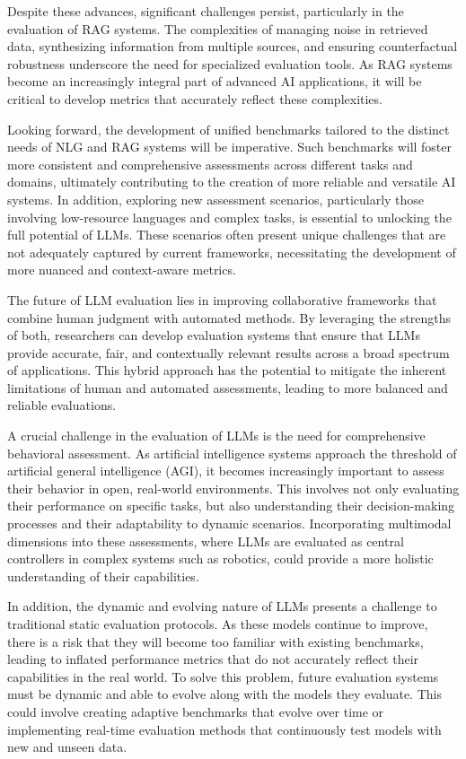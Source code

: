 Despite these advances, significant challenges persist, particularly in the evaluation of RAG systems. The complexities of managing noise in retrieved data, synthesizing information from multiple sources, and ensuring counterfactual robustness underscore the need for specialized evaluation tools. As RAG systems become an increasingly integral part of advanced AI applications, it will be critical to develop metrics that accurately reflect these complexities.

Looking forward, the development of unified benchmarks tailored to the distinct needs of NLG and RAG systems will be imperative. Such benchmarks will foster more consistent and comprehensive assessments across different tasks and domains, ultimately contributing to the creation of more reliable and versatile AI systems. In addition, exploring new assessment scenarios, particularly those involving low-resource languages and complex tasks, is essential to unlocking the full potential of LLMs. These scenarios often present unique challenges that are not adequately captured by current frameworks, necessitating the development of more nuanced and context-aware metrics.

The future of LLM evaluation lies in improving collaborative frameworks that combine human judgment with automated methods. By leveraging the strengths of both, researchers can develop evaluation systems that ensure that LLMs provide accurate, fair, and contextually relevant results across a broad spectrum of applications. This hybrid approach has the potential to mitigate the inherent limitations of human and automated assessments, leading to more balanced and reliable evaluations.

A crucial challenge in the evaluation of LLMs is the need for comprehensive behavioral assessment. As artificial intelligence systems approach the threshold of artificial general intelligence (AGI), it becomes increasingly important to assess their behavior in open, real-world environments. This involves not only evaluating their performance on specific tasks, but also understanding their decision-making processes and their adaptability to dynamic scenarios. Incorporating multimodal dimensions into these assessments, where LLMs are evaluated as central controllers in complex systems such as robotics, could provide a more holistic understanding of their capabilities.

In addition, the dynamic and evolving nature of LLMs presents a challenge to traditional static evaluation protocols. As these models continue to improve, there is a risk that they will become too familiar with existing benchmarks, leading to inflated performance metrics that do not accurately reflect their capabilities in the real world. To solve this problem, future evaluation systems must be dynamic and able to evolve along with the models they evaluate. This could involve creating adaptive benchmarks that evolve over time or implementing real-time evaluation methods that continuously test models with new and unseen data.

